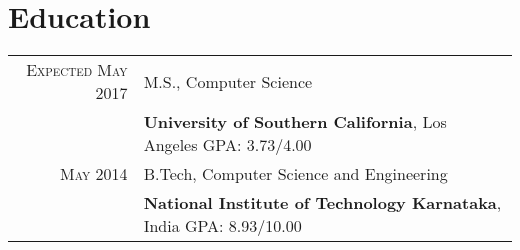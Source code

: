 \section{Education}
\begin{tabular}{rl}

\textsc{Expected May 2017} & M.S., Computer Science\\
&\textbf{University of Southern California}, Los Angeles\hspace{2.8cm} GPA: 3.73/4.00
\\
\textsc{May} 2014 & B.Tech, Computer Science and Engineering \\
&\textbf{National Institute of Technology Karnataka}, India\hspace{2cm} GPA: 8.93/10.00

\end{tabular}
\vspace{5pt}
